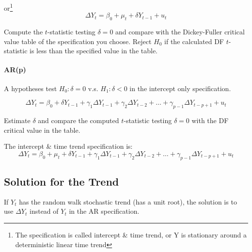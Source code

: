 \documentclass{article}
\begin{document}
or\footnote{The specification is called intercept \& time trend, or Y is stationary around a deterministic linear time trend}
\[
	\Delta Y_t = \beta_0 + \mu_t + \delta Y_{t-1} + u_t
\]

Compute the $t$-statistic testing $\delta = 0$ and compare with the Dickey-Fuller critical value table of the specification you choose.
Reject $H_0$ if the calculated DF $t$-statistic is less than the specified value in the table.

\paragraph{AR(p)}

A hypotheses test $H_0: \delta = 0$ v.s. $H_1: \delta < 0$
in the intercept only specification.

\[
	\Delta Y_t = \beta_0 + \delta Y_{t-1} + \gamma_1 \Delta Y_{t-1} + \gamma_2 \Delta Y_{t-2}
	+ \ldots + \gamma _{p-1} \Delta Y_{t-p+1} + u_t
\]

Estimate $\delta$ and compare the computed $t$-statistic testing $\delta=0$ with the DF critical value in the table.

The intercept \& time trend specification is:
\[
	\Delta Y_t = \beta_0  + \mu_t + \delta Y_{t-1} + \gamma_1 \Delta Y_{t-1} + \gamma_2 \Delta Y_{t-2}
	+ \ldots + \gamma _{p-1} \Delta Y_{t-p+1} + u_t
\]

\subsection{Solution for the Trend}

If $Y_t$ has the random walk stochastic trend (has a unit root), the solution is to use $\Delta Y_t$
instead of $Y_t$ in the AR specification.




\end{document}
